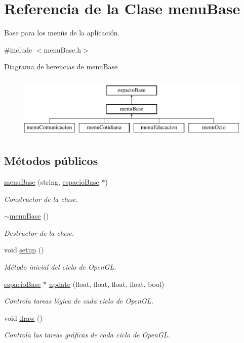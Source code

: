 \hypertarget{classmenu_base}{}\section{Referencia de la Clase menu\+Base}
\label{classmenu_base}


Base para los menús de la aplicación.  




{\ttfamily \#include $<$menu\+Base.\+h$>$}

Diagrama de herencias de menu\+Base\begin{figure}[H]
\begin{center}
\leavevmode
\includegraphics[height=3.000000cm]{classmenu_base}
\end{center}
\end{figure}
\subsection*{Métodos públicos}
\begin{DoxyCompactItemize}
\item 
\hyperlink{classmenu_base_a39dcbe65c2af659e4d27da0ec81f5824}{menu\+Base} (string, \hyperlink{classespacio_base}{espacio\+Base} $\ast$)
\begin{DoxyCompactList}\small\item\em Constructor de la clase. \end{DoxyCompactList}\item 
\hyperlink{classmenu_base_a09884cccdb9271476bbf6d87c6acfdfa}{$\sim$menu\+Base} ()
\begin{DoxyCompactList}\small\item\em Destructor de la clase. \end{DoxyCompactList}\item 
void \hyperlink{classmenu_base_a8d6e8078f62721431e095cb50bbcf40e}{setup} ()
\begin{DoxyCompactList}\small\item\em Método inicial del ciclo de Open\+G\+L. \end{DoxyCompactList}\item 
\hyperlink{classespacio_base}{espacio\+Base} $\ast$ \hyperlink{classmenu_base_aed2125585944e1dfa0ee7cb0e4f7958c}{update} (float, float, float, float, bool)
\begin{DoxyCompactList}\small\item\em Controla tareas lógica de cada ciclo de Open\+G\+L. \end{DoxyCompactList}\item 
void \hyperlink{classmenu_base_a0faf0816595b77204dd3e0309b35b76a}{draw} ()
\begin{DoxyCompactList}\small\item\em Controla las tareas gráficas de cada ciclo de Open\+G\+L. \end{DoxyCompactList}\end{DoxyCompactItemize}

